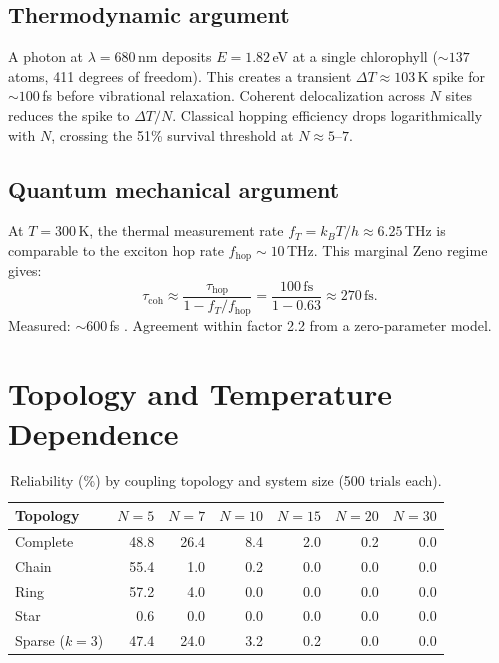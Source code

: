 \documentclass[11pt]{amsart}
\theoremstyle{definition}
\begin{document}
\subsection{Thermodynamic argument}

A photon at $\lambda = 680$\,nm deposits $E = 1.82$\,eV at a single chlorophyll ($\sim 137$ atoms, 411 degrees of freedom). This creates a transient $\Delta T \approx 103$\,K spike for $\sim 100$\,fs before vibrational relaxation. Coherent delocalization across $N$ sites reduces the spike to $\Delta T / N$. Classical hopping efficiency drops logarithmically with $N$, crossing the 51\% survival threshold at $N \approx 5$--$7$.

\subsection{Quantum mechanical argument}

At $T = 300$\,K, the thermal measurement rate $f_T = k_B T / h \approx 6.25$\,THz is comparable to the exciton hop rate $f_{\mathrm{hop}} \sim 10$\,THz. This marginal Zeno regime gives:
\begin{equation}
\tau_{\mathrm{coh}} \approx \frac{\tau_{\mathrm{hop}}}{1 - f_T / f_{\mathrm{hop}}} = \frac{100\,\mathrm{fs}}{1 - 0.63} \approx 270\,\mathrm{fs}.
\end{equation}
Measured: $\sim 600$\,fs \cite{engel2007,panitchayangkoon2010}. Agreement within factor 2.2 from a zero-parameter model.


\section{Topology and Temperature Dependence}
\label{sec:topology}

\begin{table}[ht]
\centering
\caption{Reliability (\%) by coupling topology and system size (500 trials each).}
\label{tab:topology}
\begin{tabular}{l r r r r r r}
\toprule
Topology & $N=5$ & $N=7$ & $N=10$ & $N=15$ & $N=20$ & $N=30$ \\
\midrule
Complete & 48.8 & 26.4 & 8.4 & 2.0 & 0.2 & 0.0 \\
Chain & 55.4 & 1.0 & 0.2 & 0.0 & 0.0 & 0.0 \\
Ring & 57.2 & 4.0 & 0.0 & 0.0 & 0.0 & 0.0 \\
Star & 0.6 & 0.0 & 0.0 & 0.0 & 0.0 & 0.0 \\
Sparse ($k=3$) & 47.4 & 24.0 & 3.2 & 0.2 & 0.0 & 0.0 \\
\bottomrule
\end{tabular}
\end{table}
\end{document}
